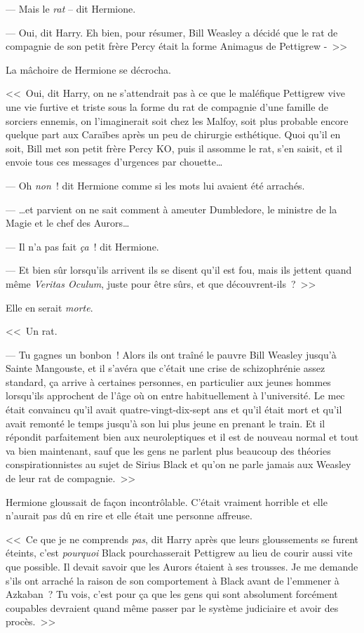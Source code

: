 --- Mais le \emph{rat} -- dit Hermione.

--- Oui, dit Harry. Eh bien, pour résumer, Bill Weasley a décidé que le rat de compagnie de son petit frère Percy était la forme Animagus de Pettigrew -~>>

La mâchoire de Hermione se décrocha.

<<~Oui, dit Harry, on ne s'attendrait pas à ce que le maléfique Pettigrew vive une vie furtive et triste sous la forme du rat de compagnie d'une famille de sorciers ennemis, on l'imaginerait soit chez les Malfoy, soit plus probable encore quelque part aux Caraïbes après un peu de chirurgie esthétique. Quoi qu'il en soit, Bill met son petit frère Percy KO, puis il assomme le rat, s'en saisit, et il envoie tous ces messages d'urgences par chouette…

--- Oh \emph{non}~! dit Hermione comme si les mots lui avaient été arrachés.

--- …et parvient on ne sait comment à ameuter Dumbledore, le ministre de la Magie et le chef des Aurors…

--- Il n'a pas fait \emph{ça}~! dit Hermione.

--- Et bien sûr lorsqu'ils arrivent ils se disent qu'il est fou, mais ils jettent quand même \emph{Veritas Oculum}, juste pour être sûrs, et que découvrent-ils~?~>>

Elle en serait \emph{morte}.

<<~Un rat.

--- Tu gagnes un bonbon~! Alors ils ont traîné le pauvre Bill Weasley jusqu'à Sainte Mangouste, et il s'avéra que c'était une crise de schizophrénie assez standard, ça arrive à certaines personnes, en particulier aux jeunes hommes lorsqu'ils approchent de l'âge où on entre habituellement à l'université. Le mec était convaincu qu'il avait quatre-vingt-dix-sept ans et qu'il était mort et qu'il avait remonté le temps jusqu'à son lui plus jeune en prenant le train. Et il répondit parfaitement bien aux neuroleptiques et il est de nouveau normal et tout va bien maintenant, sauf que les gens ne parlent plus beaucoup des théories conspirationnistes au sujet de Sirius Black et qu'on ne parle jamais aux Weasley de leur rat de compagnie.~>>

Hermione gloussait de façon incontrôlable. C'était vraiment horrible et elle n'aurait pas dû en rire et elle était une personne affreuse.

<<~Ce que je ne comprends \emph{pas}, dit Harry après que leurs gloussements se furent éteints, c'est \emph{pourquoi} Black pourchasserait Pettigrew au lieu de courir aussi vite que possible. Il devait savoir que les Aurors étaient à ses trousses. Je me demande s'ils ont arraché la raison de son comportement à Black avant de l'emmener à Azkaban~? Tu vois, c'est pour ça que les gens qui sont absolument forcément coupables devraient quand même passer par le système judiciaire et avoir des procès.~>>

